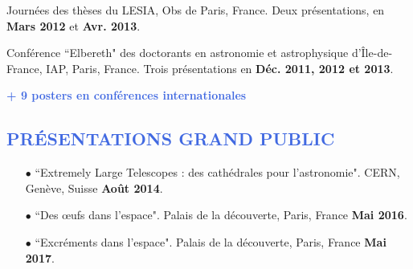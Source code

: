\documentclass[11pt,a4paper, french]{article}
\begin{document}
\begin{etaremune}
\item Journées des thèses du LESIA, Obs de Paris, France. Deux présentations, en \textbf{Mars 2012} et \textbf{Avr. 2013}.

\item Conférence ``Elbereth" des doctorants en astronomie et astrophysique d'Île-de-France, IAP, Paris, France. Trois présentations en \textbf{Déc. 2011, 2012 et 2013}.\\

\end{etaremune}


\textcolor{RoyalBlue}{\Large{\bf + 9 posters en conférences internationales}}

\textcolor{RoyalBlue}{\subsection{\large PRÉSENTATIONS GRAND PUBLIC}}

\begin{enumerate}\itemsep 3pt
\item[$\bullet$]  ``Extremely Large Telescopes : des cathédrales pour l'astronomie". CERN, Genève, Suisse \textbf{Août 2014}.

\item[$\bullet$] ``Des œufs dans l'espace". Palais de la découverte, Paris, France \textbf{Mai 2016}.

\item[$\bullet$] ``Excréments dans l'espace". Palais de la découverte, Paris, France \textbf{Mai 2017}.
\end{enumerate}
\end{document}
